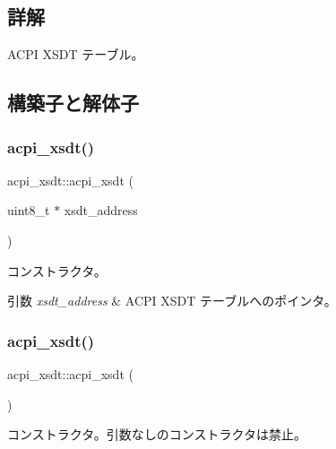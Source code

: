 \subsection{詳解}
A\+C\+PI X\+S\+DT テーブル。 

\subsection{構築子と解体子}
\hypertarget{classacpi__xsdt_a45f31058ad0b744f139f16d0d667ae79}{}\label{classacpi__xsdt_a45f31058ad0b744f139f16d0d667ae79} 
\subsubsection{\texorpdfstring{acpi\+\_\+xsdt()}{acpi\_xsdt()}\hspace{0.1cm}{\footnotesize\ttfamily [1/4]}}
{\footnotesize\ttfamily acpi\+\_\+xsdt\+::acpi\+\_\+xsdt (\begin{DoxyParamCaption}\item[{uint8\+\_\+t $\ast$}]{xsdt\+\_\+address }\end{DoxyParamCaption})}

コンストラクタ。 
\begin{DoxyParams}{引数}
{\em xsdt\+\_\+address} & A\+C\+PI X\+S\+DT テーブルへのポインタ。 \\
\hline
\end{DoxyParams}
\hypertarget{classacpi__xsdt_a0d97823b32d69e5523ffe223749f7e20}{}\label{classacpi__xsdt_a0d97823b32d69e5523ffe223749f7e20} 
\subsubsection{\texorpdfstring{acpi\+\_\+xsdt()}{acpi\_xsdt()}\hspace{0.1cm}{\footnotesize\ttfamily [2/4]}}
{\footnotesize\ttfamily acpi\+\_\+xsdt\+::acpi\+\_\+xsdt (\begin{DoxyParamCaption}{ }\end{DoxyParamCaption})\hspace{0.3cm}{\ttfamily [delete]}}

コンストラクタ。引数なしのコンストラクタは禁止。 \hypertarget{classacpi__xsdt_a2ad4887e1b44d5de06d473851e446407}{}\label{classacpi__xsdt_a2ad4887e1b44d5de06d473851e446407} 
